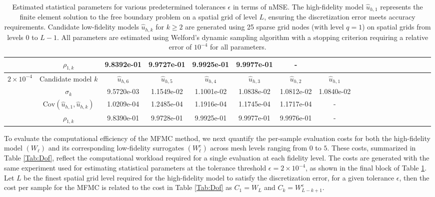 \begin{table}[ht]
{\begin{tabular}{|c|c|c|c|c|c|c|c|c|c|c|c|c|c|c|c|c|c|c|}
\cline{2-7}	
&\multicolumn{1}{|c|}{$\rho_{1,k}$}&9.8392e-01 &9.9727e-01 &9.9925e-01 &9.9977e-01 &- &\\
\hline
\hline
\multirow{4}{*}{$2\times 10^{-4}$} &\multicolumn{1}{|c|}{Candidate model $k$} &$\widehat u_{h,6}$&$\widehat u_{h,5}$&$\widehat u_{h,4}$&$\widehat u_{h,3}$&$\widehat u_{h,2}$&$\widehat u_{h,1}$\\
\cline{2-8}
&\multicolumn{1}{|c|}{$\sigma_{k}$}&9.5720e-03   &1.1549e-02   &1.1001e-02   &1.0838e-02   &1.0812e-02  &1.0840e-02\\
\cline{2-8}	
&\multicolumn{1}{|c|}{$\text{Cov}\left(\widehat u_{h,1},\widehat u_{h,k}\right)$}&1.0209e-04&1.2485e-04&1.1916e-04&1.1745e-04&1.1717e-04&-\\
\cline{2-8}	
&\multicolumn{1}{|c|}{$\rho_{1,k}$}&9.8390e-01   &9.9728e-01   &9.9925e-01   &9.9977e-01   &9.9976e-01   &-\\
\hline
\end{tabular}}
\caption{Estimated statistical parameters for various predetermined tolerances $\epsilon$ in terms of nMSE. The high-fidelity model $\widehat u_{h,1}$ represents the finite element solution to the free boundary problem on a spatial grid of level $L$, ensuring the discretization error meets accuracy requirements. Candidate low-fidelity models $\widehat u_{h,k}$ for $k \geq 2$ are generated using 25 sparse grid nodes (with level $q=1$) on spatial grids from levels 0 to $L-1$. All parameters are estimated using Welford's dynamic sampling algorithm with a stopping criterion requiring a relative error of $10^{-4}$ for all parameters.}
\label{Tab:MFMC_parameters}
\end{table}
%


To evaluate the computational efficiency of the MFMC method, we next quantify the per-sample evaluation costs for both the high-fidelity model $(W_\ell)$ and its corresponding low-fidelity surrogates $(W_\ell^e)$ across mesh levels ranging from $0$ to $5$. These costs, summarized in Table \ref{Tab:Dof}, reflect the computational workload required for a single evaluation at each fidelity level. The costs are generated with the same experiment used for estimating statistical parameters at the tolerance threshold $\epsilon=2\times 10^{-4}$, as shown in the final block of Table \ref{Tab:MFMC_parameters}. Let $L$ be the finest spatial grid level required for the high-fidelity model to satisfy the discretization error, for a given tolerance $\epsilon$, then the cost per sample for the MFMC is related to the cost in Table \ref{Tab:Dof} as $C_1=W_{L}$ and $C_k=W_{L-k+1}^e$.

